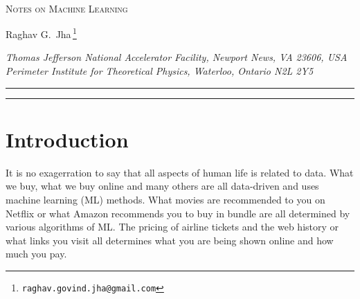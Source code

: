 \documentclass[11pt]{article}
\begin{document}
	\begin{titlepage}
		\setcounter{page}{1} \baselineskip=15.5pt \thispagestyle{empty}
		\bigskip\
		\vspace{1cm}
		\begin{center}
			{\fontsize{19}{38}\textsc{Notes on Machine Learning}}  %
		\end{center}
		\vspace{0.2cm}
		\begin{center}
			{\fontsize{12}{30}\selectfont Raghav G.~Jha\orcidA{}\,\footnote{\texttt{raghav.govind.jha@gmail.com}}}
		\end{center}
		
		
		\begin{center}
			\vskip 7pt
			\textsl{Thomas Jefferson National Accelerator Facility, Newport News, VA 23606, USA\\
			Perimeter Institute for Theoretical Physics, Waterloo, Ontario N2L 2Y5\\
				}
			\vskip 6pt
		\end{center}
		
		\vspace{2.6cm}
		\hrule \vspace{0.2cm}
\vspace{0.5cm}
\hrule

\vspace{0.5cm}		
		\tableofcontents
		\vspace{0.6cm}
	\end{titlepage}
	
	
	\section{Introduction}
	
	It is no exagerration to say that all aspects of human life is related to data. What we buy, what we buy online and many others
	are all data-driven and uses machine learning (ML) methods. What movies are recommended to you on Netflix or what Amazon
	recommends you to buy in bundle are all determined by various algorithms of ML. The pricing of airline tickets and the web history 
	or what links you visit all determines what you are being shown online and how much you pay. 
	
\end{document}
